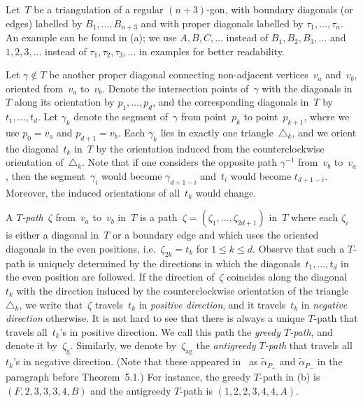 \documentclass[10pt]{amsart}
\theoremstyle{definition}\newtheorem{rema}[theo]{Remark}\newtheorem{exem}[theo]{Example}
\newcommand{\Dfn}[1]{\emph{#1}}
\newcommand{\zetag}{{\zeta_{\operatorname{g}}}}
\newcommand{\zetaag}{{\zeta_{\operatorname{ag}}}}
\begin{document}

Let~$T$ be a triangulation of a regular $(n+3)$-gon, with boundary diagonals (or edges) labelled by $B_1,\dots,B_{n+3}$ and with proper diagonals labelled by $\tau_1,\dots,\tau_n$. An example can be found in (a); we use $A,B,C,\dots$ instead of $B_1,B_2,B_3,\dots$ and $1,2,3,\dots$ instead of $\tau_1,\tau_2,\tau_3,\dots$ in examples for better readability.

Let $\gamma\notin T$ be another proper diagonal connecting non-adjacent vertices~$v_a$ and~$v_b$, oriented from~$v_a$ to~$v_b$. Denote the intersection points of~$\gamma$ with the diagonals in~$T$ along its orientation by $p_1,\dots,p_d$, and the corresponding diagonals in~$T$ by~$t_1,\dots,t_d$. Let $\gamma_{k}$ denote the segment of~$\gamma$ from point~$p_k$ to point~$p_{k+1}$, where we use $p_0=v_a$ and $p_{d+1}=v_b$. Each $\gamma_k$ lies in exactly one triangle~$\triangle_k$, and we orient the diagonal~$t_k$ in~$T$ by the orientation induced from the counterclockwise orientation of~$\triangle_k$. Note that if one considers the opposite path $\gamma^{-1}$ from~$v_b$ to~$v_a$, then the segment~$\gamma_i$ would become $\gamma_{d+1-i}$ and~$t_i$ would become $t_{d+1-i}$. Moreover, the induced orientations of all~$t_k$ would change.

A \Dfn{$T$-path}~$\zeta$ from~$v_a$ to~$v_b$ in~$T$ is a path~$\zeta=(\zeta_1,\dots,\zeta_{2d+1})$ in~$T$ where each $\zeta_i$ is either a diagonal in~$T$ or a boundary edge and which uses the oriented diagonals in the even positions, i.e.~$\zeta_{2k}=t_k$ for $1 \leq k \leq d$. Observe that such a $T$-path is uniquely determined by the directions in which the diagonals~$t_1,\dots,t_d$ in the even position are followed. If the direction of~$\zeta$ coincides along the diagonal~$t_k$ with the direction induced by the counterclockwise orientation of the triangle~$\triangle_k$, we write that~$\zeta$ travels~$t_k$ in \Dfn{positive direction}, and it travels~$t_k$ in \Dfn{negative direction} otherwise. It is not hard to see that there is always a unique $T$-path that travels all~$t_k$'s in positive direction. We call this path the \Dfn{greedy $T$-path}, and denote it by~$\zetag$. Similarly, we denote by~$\zetaag$ the \Dfn{antigreedy $T$-path} that travels all~$t_k$'s in negative direction. (Note that these appeared in~\cite{MS2010} as $\widetilde\alpha_{P_+}$ and $\widetilde\alpha_{P_-}$ in the paragraph before Theorem~5.1.) For instance, the greedy $T$-path in (b) is $(F,2,3,3,3,4,B)$ and the antigreedy $T$-path is $(1,2,2,3,4,4,A)$.
\end{document}
